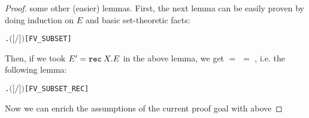 \begin{proof}
some other (easier) lemmas. First, the next lemma can be easily proven
by doing induction on $E$ and basic set-theoretic facts:
\begin{alltt}
\HOLTokenTurnstile{} \HOLSymConst{\HOLTokenForall{}}  .  \ensuremath{(}\ensuremath{[}\ensuremath{/}\ensuremath{]} \ensuremath{)} \HOLSymConst{\HOLTokenSubset{}}   \HOLSymConst{\HOLTokenUnion{}}  \hfill{[FV_SUBSET]}
\end{alltt}
Then, if we took $E' = {\tt rec}\: X . E$ in the above lemma, we get
 $=$  $=$
, i.e. the following lemma:
\begin{alltt}
\HOLTokenTurnstile{} \HOLSymConst{\HOLTokenForall{}} .  \ensuremath{(}\ensuremath{[}  \ensuremath{/}\ensuremath{]} \ensuremath{)} \HOLSymConst{\HOLTokenSubset{}}  \hfill{[FV_SUBSET_REC]}
\end{alltt}
Now we can enrich the assumptions of the current proof goal with above

\end{proof}
